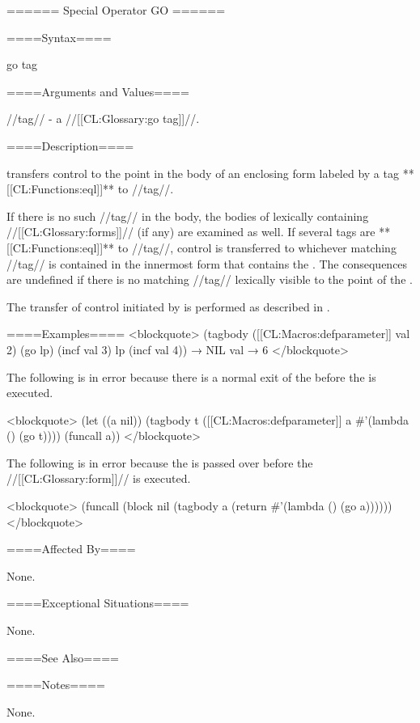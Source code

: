 ====== Special Operator GO ======

====Syntax====

\DefspecNoReturn go {tag}

====Arguments and Values====

//tag// - a //[[CL:Glossary:go tag]]//.

====Description====

 transfers control to the point in the body of an enclosing  form labeled by a tag **[[CL:Functions:eql]]** to //tag//.

If there is no such //tag// in the body, the bodies of lexically containing  //[[CL:Glossary:forms]]// (if any) are examined as well. If several tags are **[[CL:Functions:eql]]** to //tag//, control is transferred to whichever matching //tag// is contained in the innermost  form that contains the . The consequences are undefined if there is no matching //tag// lexically visible to the point of the .

The transfer of control initiated by  is performed as described in \secref\TransferOfControl.

====Examples==== <blockquote> (tagbody ([[CL:Macros:defparameter]] val 2) (go lp) (incf val 3) lp (incf val 4)) → NIL val → 6 </blockquote>



The following is in error because there is a normal exit of the  before the  is executed.

<blockquote> (let ((a nil)) (tagbody t ([[CL:Macros:defparameter]] a #'(lambda () (go t)))) (funcall a)) </blockquote>

The following is in error because the  is passed over before the  //[[CL:Glossary:form]]// is executed.

<blockquote> (funcall (block nil (tagbody a (return #'(lambda () (go a)))))) </blockquote>

====Affected By====

None.

====Exceptional Situations====

None.

====See Also====


====Notes====

None.


